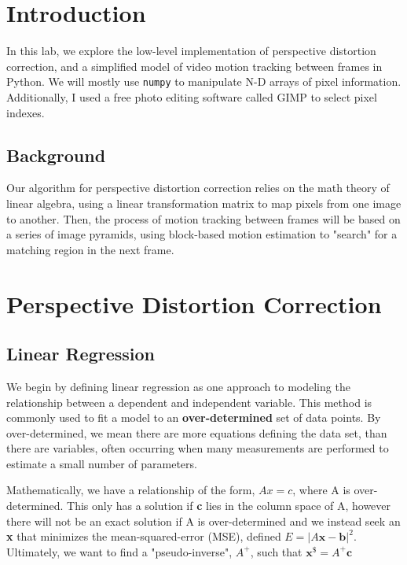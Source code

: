 \documentclass[11pt,a4paper]{article}
\begin{document}
\pagebreak

\tableofcontents

\pagebreak

\section{Introduction}
In this lab, we explore the low-level implementation of perspective distortion correction, and a simplified model of video motion tracking between frames in Python. We will mostly use \verb|numpy| to manipulate N-D arrays of pixel information. Additionally, I used a free photo editing software called GIMP to select pixel indexes.

\subsection{Background}
Our algorithm for perspective distortion correction relies on the math theory of linear algebra, using a linear transformation matrix to map pixels from one image to another. Then, the process of motion tracking between frames will be based on a series of image pyramids, using block-based motion estimation to "search" for a matching region in the next frame.

\section{Perspective Distortion Correction}
\subsection{Linear Regression}
We begin by defining linear regression as one approach to modeling the relationship between a dependent and independent variable. This method is commonly used to fit a model to an \textbf{over-determined} set of data points. By over-determined, we mean there are more equations defining the data set, than there are variables, often occurring when many measurements are performed to estimate a small number of parameters. 

Mathematically, we have a relationship of the form, $Ax=c$, where A is over-determined. This only has a solution if \textbf{c} lies in the column space of A, however there will not be an exact solution if A is over-determined and we instead seek an \textbf{x} that minimizes the mean-squared-error (MSE), defined $E=|A\textbf{x}-\textbf{b}|^2$. Ultimately, we want to find a "pseudo-inverse", $A^+$, such that $\textbf{x}^\$=A^+\textbf{c}$
\end{document}
